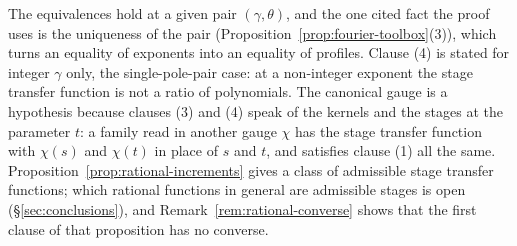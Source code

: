 The equivalences hold at a given pair $(\gamma,\theta)$, and the one cited fact the proof uses
is the uniqueness of the \Levy{} pair (Proposition~\ref{prop:fourier-toolbox}(3)), which turns
an equality of exponents into an equality of profiles. Clause (4) is stated for integer
$\gamma$ only, the single-pole-pair case: at a non-integer exponent the stage transfer
function is not a ratio of polynomials. The canonical gauge is a hypothesis because clauses (3)
and (4) speak of the kernels and the stages at the parameter $t$: a \Matern{} family read in
another gauge $\chi$ has the stage transfer function with $\chi(s)$ and $\chi(t)$ in place of $s$
and $t$, and satisfies clause (1) all the same.
Proposition~\ref{prop:rational-increments} gives a class of admissible stage transfer functions;
which rational functions in general are admissible stages is open (\S\ref{sec:conclusions}), and
Remark~\ref{rem:rational-converse} shows that the first clause of that proposition has no
converse.


